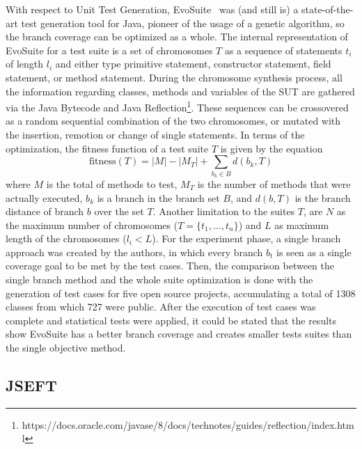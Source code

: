 \documentclass[%
  chapterprefix=false,%
  open=right,%
  twoside=true,%
  paper=a4,%
  logofile={Figures/logo.png},%
  thesistype=master,%
  UKenglish,%
]{se2thesis}
\begin{document}
With respect to Unit Test Generation, EvoSuite~\cite{DBLP:conf/qsic/FraserA11} was (and still is) a state-of-the-art test generation tool for Java, pioneer of the usage of a genetic algorithm, so the branch coverage can be optimized as a whole.
The internal representation of EvoSuite for a test suite is a set of chromosomes \(T\) as a sequence of statements \(t_i\) of length \(l_i\) and either type primitive statement, constructor statement, field statement, or method statement.
During the chromosome synthesis process, all the information regarding classes, methods and variables of the SUT are gathered via the Java Bytecode and Java Reflection\footnote{https://docs.oracle.com/javase/8/docs/technotes/guides/reflection/index.html}.
These sequences can be crossovered as a random sequential combination of the two chromosomes, or mutated with the insertion, remotion or change of single statements.
In terms of the optimization, the fitness function of a test suite $T$ is given by the equation
\[ \text{fitness}(T) = |M| - |M_T| + \sum_{b_k \in B} d(b_k, T) \]
where \(M\) is the total of methods to test, \(M_T\) is the number of methods that were actually executed, \(b_k\) is a branch in the branch set \(B\), and \(d(b, T)\) is the branch distance of branch \(b\) over the set \(T\).
Another limitation to the suites \(T\), are \(N\) as the maximum number of chromosomes (\(T = \{t_1, \dots , t_n\}\)) and \(L\) as maximum length of the chromosomes (\(l_i < L\)).
For the experiment phase, a single branch approach was created by the authors, in which every branch \(b_t\) is seen as a single coverage goal to be met by the test cases.
Then, the comparison between the single branch method and the whole suite optimization is done with the generation of test cases for five open source projects, accumulating a total of 1308 classes from which 727 were public.
After the execution of test cases was complete and statistical tests were applied, it could be stated that the results show EvoSuite has a better branch coverage and creates smaller tests suites than the single objective method.

\subsection*{JSEFT}
\end{document}
